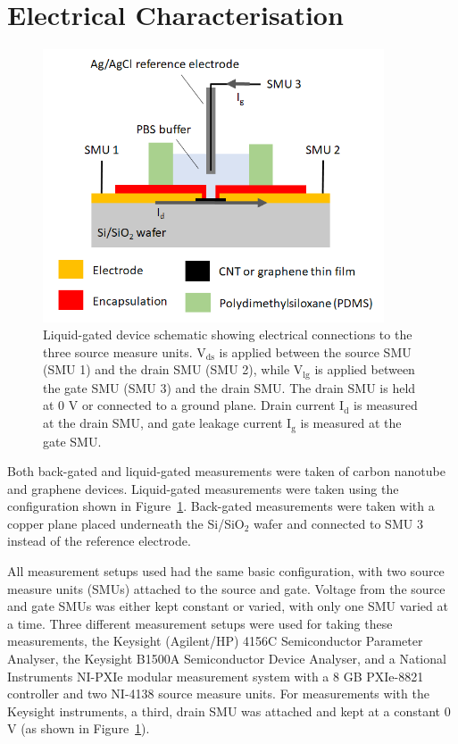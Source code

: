 \documentclass[
  a4paper,
]{scrbook}
\begin{document}
\hypertarget{sec-electrical-characterisation}{%
\section{Electrical
Characterisation}\label{sec-electrical-characterisation}}

\begin{figure}

{\centering \includegraphics[width=0.9\textwidth,height=\textheight]{./figures/ch4/liquid-gate-schematic.png}

}

\caption{\label{fig-liquid-gate-schematic}Liquid-gated device schematic
showing electrical connections to the three source measure units.
V\(_{\mathrm{ds}}\) is applied between the source SMU (SMU 1) and the
drain SMU (SMU 2), while V\(_{\mathrm{lg}}\) is applied between the gate
SMU (SMU 3) and the drain SMU. The drain SMU is held at 0 V or connected
to a ground plane. Drain current I\(_{\mathrm{d}}\) is measured at the
drain SMU, and gate leakage current I\(_{\mathrm{g}}\) is measured at
the gate SMU.}

\end{figure}

Both back-gated and liquid-gated measurements were taken of carbon
nanotube and graphene devices. Liquid-gated measurements were taken
using the configuration shown in Figure~\ref{fig-liquid-gate-schematic}.
Back-gated measurements were taken with a copper plane placed underneath
the Si/SiO\(_2\) wafer and connected to SMU 3 instead of the reference
electrode.

All measurement setups used had the same basic configuration, with two
source measure units (SMUs) attached to the source and gate. Voltage
from the source and gate SMUs was either kept constant or varied, with
only one SMU varied at a time. Three different measurement setups were
used for taking these measurements, the Keysight (Agilent/HP) 4156C
Semiconductor Parameter Analyser, the Keysight B1500A Semiconductor
Device Analyser, and a National Instruments NI-PXIe modular measurement
system with a 8 GB PXIe-8821 controller and two NI-4138 source measure
units. For measurements with the Keysight instruments, a third, drain
SMU was attached and kept at a constant 0 V (as shown in
Figure~\ref{fig-liquid-gate-schematic}).
\end{document}
